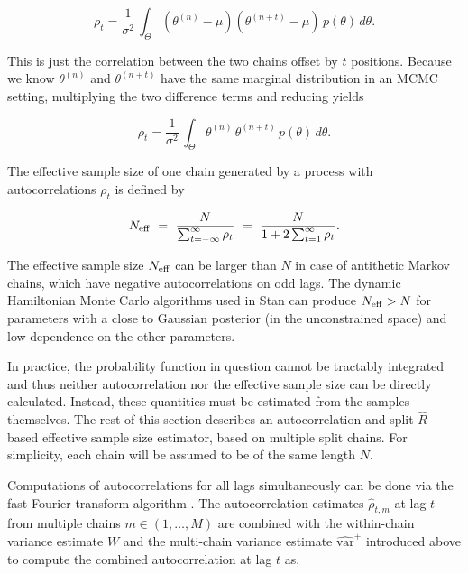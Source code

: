 \documentclass[american,]{article}
\theoremstyle{definition}
\begin{document}
\begin{equation}
\rho_t = \frac{1}{\sigma^2} \, \int_{\Theta} (\theta^{(n)} - \mu)
(\theta^{(n+t)} - \mu) \, p(\theta) \, d \theta.
\end{equation}

This is just the correlation between the two chains offset by \(t\)
positions. Because we know \(\theta^{(n)}\) and \(\theta^{(n+t)}\) have
the same marginal distribution in an MCMC setting, multiplying the two
difference terms and reducing yields

\begin{equation}
\rho_t = \frac{1}{\sigma^2} \, \int_{\Theta} \theta^{(n)} \, \theta^{(n+t)}
\, p(\theta) \, d \theta.
\end{equation}

The effective sample size of one chain generated by a process with
autocorrelations \(\rho_t\) is defined by

\begin{equation}
N_{\rm eff} \ = \
\frac{N}{\sum_{t = -\infty}^{\infty} \rho_t} \ = \
\frac{N}{1 + 2 \sum_{t = 1}^{\infty} \rho_t}.
\end{equation}

The effective sample size \(N_{\rm eff}\) can be larger than \(N\) in case
of antithetic Markov chains, which have negative autocorrelations on odd
lags. The dynamic Hamiltonian Monte Carlo algorithms used in Stan
\citep{Hoffman+Gelman:2014, betancourt2017conceptual} can produce
\(N_{\rm eff}>N\) for parameters with a close to Gaussian posterior (in
the unconstrained space) and low dependence on the other parameters.

In practice, the probability function in question cannot be tractably
integrated and thus neither autocorrelation nor the effective sample
size can be directly calculated. Instead, these quantities must be estimated from
the samples themselves. The rest of this section describes an
autocorrelation and split-\(\widehat{R}\) based effective sample size
estimator, based on multiple split chains. For simplicity, each chain
will be assumed to be of the same length \(N\).

Computations of autocorrelations for all lags simultaneously can be done
via the fast Fourier transform algorithm \citep[FFT; see][]{Geyer:2011}. 
The autocorrelation estimates \(\hat{\rho}_{t,m}\)
at lag \(t\) from multiple chains \(m \in (1,\ldots,M)\) are combined
with the within-chain variance estimate \(W\) and the multi-chain
variance estimate \(\widehat{\mbox{var}}^{+}\) introduced above to
compute the combined autocorrelation at lag \(t\) as,
\end{document}

